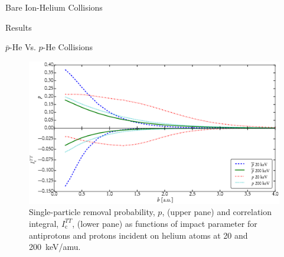 \documentclass[a5paper, 9 pt]{extreport}
\begin{document}
\begin{chapter}{Bare Ion-Helium Collisions \label{chap:p-he2p-he}}
\begin{section}{Results \label{sec:phe2p-res}}
\begin{subsection}{ \texorpdfstring{$\bar{p}$}{pbar}-He Vs. \texorpdfstring{$p$}{p}-He Collisions
                         \label{sec:pbarhe-res}}
         \begin{figure}[t]
            \centering
            \includegraphics[width = 0.95 \linewidth]{./images/p-ic.eps}
            \caption[Single-particle removal and correlation integral]
                    {Single-particle removal probability, $p$, (upper pane) and
                     correlation integral, $I_\mathrm{c}^{TT}$, (lower pane) as functions of impact
                     parameter for antiprotons and protons incident on helium atoms at 20 and
                     200~keV/amu. \label{fig:p-ic}}
         \end{figure}


\end{subsection}
\end{section}
\end{chapter}
\end{document}
